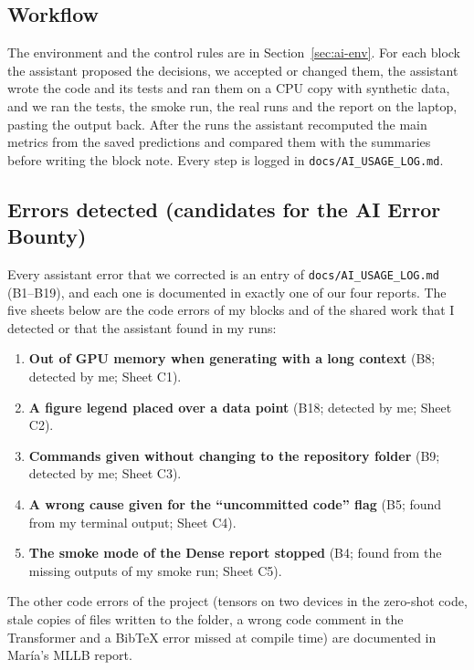 \label{app:ai-code}

\subsection*{Workflow}

The environment and the control rules are in Section~\ref{sec:ai-env}. For each block the assistant
proposed the decisions, we accepted or changed them, the assistant wrote the code and its tests and ran
them on a CPU copy with synthetic data, and we ran the tests, the smoke run, the real runs and the report
on the laptop, pasting the output back. After the runs the assistant recomputed the main metrics from
the saved predictions and compared them with the summaries before writing the block note. Every step is
logged in \texttt{docs/AI\_USAGE\_LOG.md}.

\subsection*{Errors detected (candidates for the AI Error Bounty)}

Every assistant error that we corrected is an entry of \texttt{docs/AI\_USAGE\_LOG.md} (B1--B19), and each
one is documented in exactly one of our four reports. The five sheets below are the code errors of my
blocks and of the shared work that I detected or that the assistant found in my runs:
\begin{enumerate}[leftmargin=1.4em,itemsep=1pt]
  \item \textbf{Out of GPU memory when generating with a long context} (B8; detected by me; Sheet C1).
  \item \textbf{A figure legend placed over a data point} (B18; detected by me; Sheet C2).
  \item \textbf{Commands given without changing to the repository folder} (B9; detected by me; Sheet C3).
  \item \textbf{A wrong cause given for the ``uncommitted code'' flag} (B5; found from my terminal output;
        Sheet C4).
  \item \textbf{The smoke mode of the Dense report stopped} (B4; found from the missing outputs of my smoke
        run; Sheet C5).
\end{enumerate}
The other code errors of the project (tensors on two devices in the zero-shot code, stale copies of files
written to the folder, a wrong code comment in the Transformer and a BibTeX error missed at compile time)
are documented in Mar\'ia's MLLB report.

